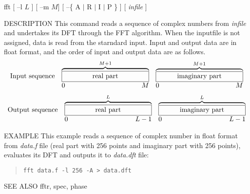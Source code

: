 
\begin{synopsis}
\item[fft] [ --l $L$ ] [ --m $M$] [ --\{ A $|$ R $|$ I $|$ P \} ] 
	   [ {\em infile} ] 
\end{synopsis}

\begin{qsection}{DESCRIPTION}
This command reads a sequence of complex numbers from {\em infile}
and undertakes its DFT through the FFT algorithm.
When the inputfile is not assigned, data is read from the starndard
input.
Input and output data are in float format, and the order of input
 and output data are as follows.
\[
 \begin{array}{lll}
\mbox{Input sequence} & \overbrace{\framebox[4.5cm]{real part}}^{M+1} &
	   \overbrace{\framebox[4.5cm]{imaginary part}}^{M+1} \\
		& \makebox[4.5cm]{0\hfill $M$} &
		\makebox[4.5cm]{0\hfill $M$}
\end{array}
\]
\[
\begin{array}{lll}
\mbox{Output sequence} & \overbrace{\framebox[4.5cm]{real part}}^{L} &
	   \overbrace{\framebox[4.5cm]{imaginary part}}^{L} \\
		& \makebox[4.5cm]{0\hfill $L-1$} &
		\makebox[4.5cm]{0\hfill $L-1$}
\end{array}
\]
\end{qsection}

\begin{options}
\end{options}

\begin{qsection}{EXAMPLE}
This example reads a sequence of complex number in float format from
{\em data.f} file (real part with 256 points and imaginary part with
256 points), evaluates its DFT and outputs it to {\em data.dft} file:
\begin{quote}
  \verb!fft data.f -l 256 -A > data.dft!
\end{quote}
\end{qsection}

\begin{qsection}{SEE ALSO}
  fftr, spec, phase
\end{qsection}
